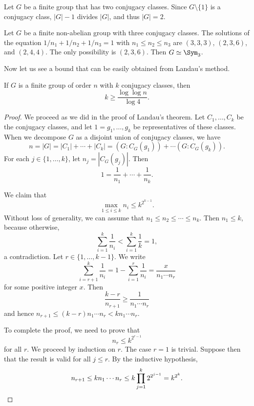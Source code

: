 \begin{example}
  Let $G$ be a finite group that has two conjugacy classes. Since $G\setminus\{1\}$ is a conjugacy class, $|G|-1$ divides $|G|$, and thus $|G|=2$.
\end{example}

\begin{example}
  Let $G$ be a finite non-abelian group with three conjugacy classes. The solutions of the equation $1/n_1+1/n_2+1/n_3=1$ with $n_1\leq n_2\leq n_3$ are $(3,3,3)$, $(2,3,6)$, and $(2,4,4)$. The only possibility is $(2,3,6)$. Then $G\simeq\Sym_3$.
\end{example}

Now let us see a bound that can be easily obtained from Landau's method.

\begin{theorem}[Neumann]
If $G$ is a finite group of order $n$ with $k$ conjugacy classes, then
\[
k\geq\frac{\log\log n}{\log 4}.
\]
\end{theorem}

\begin{proof}
We proceed as we did in the proof of Landau's theorem. Let $C_1,\dots,C_k$ be the conjugacy classes, and let $1=g_1,\dots,g_k$ be representatives of these classes. When we decompose $G$ as a disjoint union of conjugacy classes, we have 
\[
n=|G|=|C_1|+\cdots+|C_k|=(G:C_G(g_1))+\cdots(G:C_G(g_k)).
\]
For each $j \in \{1,\dots,k\}$, let $n_j=|C_G(g_j)|$. Then 
\[
	1=\frac{1}{n_1}+\cdots+\frac{1}{n_k}.
\]

We claim that 
\[
\max_{1\leq i\leq k}n_i\leq k^{2^{k-1}}.
\]
Without loss of generality, we can assume that $n_1\leq n_2\leq\cdots\leq n_k$. Then $n_1\leq k$, because otherwise, 
\[
\sum_{i=1}^k\frac{1}{n_i}<\sum_{i=1}^k\frac{1}{k}=1,
\]
a contradiction. Let $r\in\{1,\dots,k-1\}$. We write
\[
\sum_{i=r+1}^k\frac{1}{n_i}=1-\sum_{i=1}^r\frac{1}{n_i}=\frac{x}{n_1\cdots n_r}
\]
for some positive integer $x$. Then
\[
\frac{k-r}{n_{r+1}}\geq\frac{1}{n_1\cdots n_r}
\]
and hence $n_{r+1}\leq (k-r)n_1\cdots n_r<kn_1\cdots n_r$.

To complete the proof, we need to prove that 
\begin{equation}
    \label{eq:Neumann}
    n_r\leq k^{2^{r-1}}
\end{equation}
for all $r$. We proceed by induction on $r$. The case $r=1$ is trivial. Suppose then that the result is valid
for all $j\leq r$. By the inductive hypothesis, 
\[
n_{r+1}\leq kn_1\cdots n_r\leq k\prod_{j=1}^k2^{2^{j-1}}=k^{2^k}.\qedhere
\]
\end{proof}

